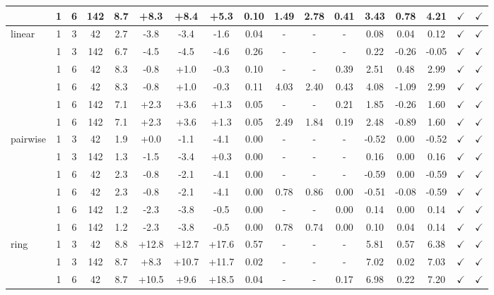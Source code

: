 \documentclass[
    reprint,
    amsmath, amssymb,
    aps,
    floatfix,
    nofootinbib
]{revtex4-1}
\begin{document}
\begin{table}[h!]
{\begin{tabular}{l|cc|c|c|ccc|cccc|ccc|cc}
 & 1 & 6 & 142 & 8.7 & +8.3 & +8.4 & +5.3 & 0.10 & 1.49 & 2.78 & 0.41 & 3.43 & 0.78 & 4.21 & $\checkmark$ & $\checkmark$ \\
\midrule
\hline
\multirow{6}{*}{linear} & 1 & 3 & 42 & 2.7 & -3.8 & -3.4 & -1.6 & 0.04 & - & - & - & 0.08 & 0.04 & 0.12 & $\checkmark$ & $\checkmark$ \\
 & 1 & 3 & 142 & 6.7 & -4.5 & -4.5 & -4.6 & 0.26 & - & - & - & 0.22 & -0.26 & -0.05 & $\checkmark$ & $\checkmark$ \\
 & 1 & 6 & 42 & 8.3 & -0.8 & +1.0 & -0.3 & 0.10 & - & - & 0.39 & 2.51 & 0.48 & 2.99 & $\checkmark$ & $\checkmark$ \\
 & 1 & 6 & 42 & 8.3 & -0.8 & +1.0 & -0.3 & 0.11 & 4.03 & 2.40 & 0.43 & 4.08 & -1.09 & 2.99 & $\checkmark$ & $\checkmark$ \\
 & 1 & 6 & 142 & 7.1 & +2.3 & +3.6 & +1.3 & 0.05 & - & - & 0.21 & 1.85 & -0.26 & 1.60 & $\checkmark$ & $\checkmark$ \\
 & 1 & 6 & 142 & 7.1 & +2.3 & +3.6 & +1.3 & 0.05 & 2.49 & 1.84 & 0.19 & 2.48 & -0.89 & 1.60 & $\checkmark$ & $\checkmark$ \\
\midrule
\hline
\multirow{6}{*}{pairwise} & 1 & 3 & 42 & 1.9 & +0.0 & -1.1 & -4.1 & 0.00 & - & - & - & -0.52 & 0.00 & -0.52 & $\checkmark$ & $\checkmark$ \\
 & 1 & 3 & 142 & 1.3 & -1.5 & -3.4 & +0.3 & 0.00 & - & - & - & 0.16 & 0.00 & 0.16 & $\checkmark$ & $\checkmark$ \\
 & 1 & 6 & 42 & 2.3 & -0.8 & -2.1 & -4.1 & 0.00 & - &- & - & -0.59 & 0.00 & -0.59 & $\checkmark$ & $\checkmark$ \\
 & 1 & 6 & 42 & 2.3 & -0.8 & -2.1 & -4.1 & 0.00 & 0.78 & 0.86 & 0.00 & -0.51 & -0.08 & -0.59 & $\checkmark$ & $\checkmark$ \\
 & 1 & 6 & 142 & 1.2 & -2.3 & -3.8 & -0.5 & 0.00 & - & - & 0.00 & 0.14 & 0.00 & 0.14 & $\checkmark$ & $\checkmark$ \\
 & 1 & 6 & 142 & 1.2 & -2.3 & -3.8 & -0.5 & 0.00 & 0.78 & 0.74 & 0.00 & 0.10 & 0.04 & 0.14 & $\checkmark$ & $\checkmark$ \\
\midrule
\hline
\multirow{6}{*}{ring} & 1 & 3 & 42 & 8.8 & +12.8 & +12.7 & +17.6 & 0.57 & - & - &- & 5.81 & 0.57 & 6.38 & $\checkmark$ & $\checkmark$ \\
 & 1 & 3 & 142 & 8.7 & +8.3 & +10.7 & +11.7 & 0.02 & -& - & - & 7.02 & 0.02 & 7.03 & $\checkmark$ & $\checkmark$ \\
 & 1 & 6 & 42 & 8.7 & +10.5 & +9.6 & +18.5 & 0.04 & - & - & 0.17 & 6.98 & 0.22 & 7.20 & $\checkmark$ & $\checkmark$ \\

\end{tabular}}
\end{table}
\end{document}
